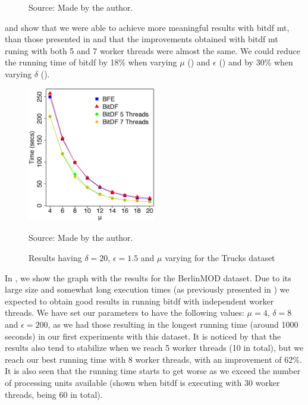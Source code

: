 {\begin{figure}[h!]
\begin{subfigure}[t]{0.49\textwidth}
        \label{fig:trucks_complete_vary_g}
    \end{subfigure}
    \footnotesize{Source: Made by the author.}
    \label{fig:trucks_complete_results}
\end{figure}

 and  show that we were able to achieve more
meaningful results with \ac{bitdf} \ac{mt}, than those presented in  and that the improvements
obtained with \ac{bitdf} \ac{mt} runing with both 5 and 7 worker threads were almost the same. We could reduce the
running time of \ac{bitdf} by 18\% when varying $\mu$ () and $\epsilon$
() and by 30\% when varying $\delta$ ().

\begin{figure}[h!]
    \centering
    \caption{Results having $\delta = 20$, $\epsilon = 1.5$ and $\mu$ varying for the Trucks dataset}
    \centerline{\includegraphics[width=0.5\textwidth]{images/Trucks_complete_varying_n.eps}}
    \footnotesize{Source: Made by the author.}
    \label{fig:trucks_complete_vary_n}
\end{figure}

In , we show the graph with the results for the BerlinMOD dataset. Due to its large size
and somewhat long execution times (as previously presented in ) we expected to obtain good results
in running \ac{bitdf} with independent worker threads. We have set our parameters to have the following values: $\mu=4$,
$\delta=8$ and $\epsilon=200$, as we had those resulting in the longest running time (around 1000 seconds) in our first
experiments with this dataset. It is noticed by  that the results also tend to stabilize
when we reach 5 worker threads (10 in total), but we reach our best running time with 8 worker threads, with an
improvement of 62\%. It is also seen that the running time starts to get worse as we exceed the number of processing
units available (shown when \ac{bitdf} is executing with 30 worker threads, being 60 in total).

}
